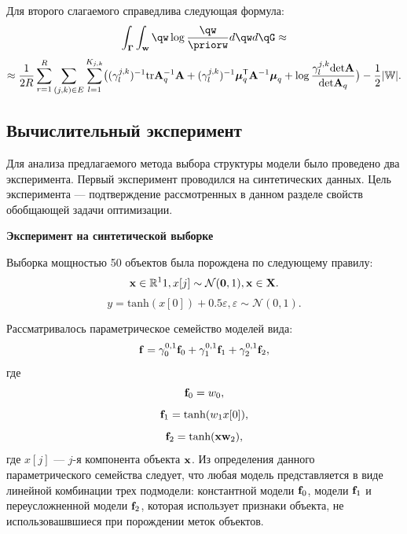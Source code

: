 Для второго слагаемого справедлива следующая формула:
\[
    \int_{\G}\int_{\w}\qw\log\frac{\qw}{\priorw}d\qw d\qG \approx
\]
\[
\approx \frac{1}{2R}\sum_{r=1}^R \sum_{(j,k) \in E} \sum_{l=1}^{K_{j,k}} \bigl( (\gamma^{j,k}_l)^{-1}\text{tr}\mathbf{A}_q^{-1}\mathbf{A} + (\gamma^{j,k}_l)^{-1} \boldsymbol{\mu}_q^{\mathsf{T}}\mathbf{A}^{-1}\boldsymbol{\mu}_q + \log \frac{\gamma^{j,k}_l\text{det}\mathbf{A}}{\text{det}\mathbf{A}_q}  \bigr) - \frac{1}{2}|\mathbb{W}|.
\]
\subsection{Вычислительный эксперимент}
Для анализа предлагаемого метода выбора структуры модели было проведено два эксперимента.
Первый эксперимент проводился на синтетических данных. Цель эксперимента --- подтверждение рассмотренных в данном разделе свойств обобщающей задачи оптимизации.

\textbf{Эксперимент на синтетической выборке}

Выборка мощностью 50 объектов была порождена по следующему правилу:
\[
    \mathbf{x} \in \mathbb{R}^11, x[j] \sim \mathcal{N}(\mathbf{0},1), \mathbf{x} \in \mathbf{X}.
\]
\[
    y = \text{tanh}(x[0]) + 0.5\varepsilon, \varepsilon \sim \mathcal{N}(0,1).
\]

Рассматривалось параметрическое семейство моделей вида:
\[
    \mathbf{f}  = \gamma_0^{0,1}\mathbf{f}_0 + \gamma_1^{0,1}\mathbf{f}_1 + \gamma_2^{0,1}\mathbf{f}_2,
\]
где
\[
    \mathbf{f}_0 = w_0,
\]
\[
    \mathbf{f}_1 = \text{tanh}(w_1 x[0]),
\]
\[
    \mathbf{f}_2 = \text{tanh}(\mathbf{x}\mathbf{w}_2),
\]
где $x[j]$ --- $j$-я компонента объекта $\mathbf{x}$.
Из определения данного параметрического семейства следует, что любая модель представляется в виде линейной комбинации трех подмодели: константной модели $\mathbf{f}_0$, модели $\mathbf{f}_1$ и переусложненной модели $\mathbf{f}_2$, которая использует признаки объекта, не использовашвшиеся при порождении меток объектов.

